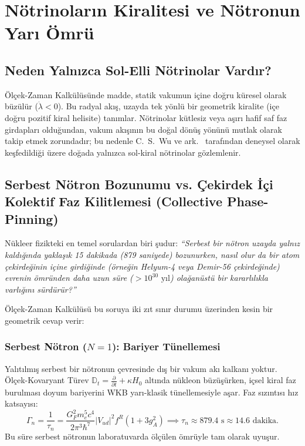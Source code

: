 \documentclass[11pt,a4paper]{article}
\begin{document}
\section{Nötrinoların Kiralitesi ve Nötronun Yarı Ömrü}

\label{sec:notrino_ve_omur}

\subsection{Neden Yalnızca Sol-Elli Nötrinolar Vardır?}
Ölçek-Zaman Kalkülüsünde madde, statik vakumun içine doğru küresel olarak büzülür ($\dot{\lambda} < 0$). Bu radyal akış, uzayda tek yönlü bir geometrik kiralite (içe doğru pozitif kiral helisite) tanımlar. Nötrinolar kütlesiz veya aşırı hafif saf faz girdapları olduğundan, vakum akışının bu doğal dönüş yönünü mutlak olarak takip etmek zorundadır; bu nedenle C.~S.~Wu ve ark.~\cite{wu1957} tarafından deneysel olarak keşfedildiği üzere doğada yalnızca sol-kiral nötrinolar gözlemlenir.

\subsection{Serbest Nötron Bozunumu vs. Çekirdek İçi Kolektif Faz Kilitlemesi (Collective Phase-Pinning)}
\label{sec:notron_omru_ve_kararlilik}

Nükleer fizikteki en temel sorulardan biri şudur: \textit{``Serbest bir nötron uzayda yalnız kaldığında yaklaşık 15 dakikada (879 saniyede) bozunurken, nasıl olur da bir atom çekirdeğinin içine girdiğinde (örneğin Helyum-4 veya Demir-56 çekirdeğinde) evrenin ömründen daha uzun süre ($> 10^{30}\text{ yıl}$) olağanüstü bir kararlılıkla varlığını sürdürür?''}

Ölçek-Zaman Kalkülüsü bu soruya iki zıt sınır durumu üzerinden kesin bir geometrik cevap verir:

\subsubsection{Serbest Nötron ($N=1$): Bariyer Tünellemesi}
Yalıtılmış serbest bir nötronun çevresinde dış bir vakum akı kalkanı yoktur. Ölçek-Kovaryant Türev $\mathbb{D}_t = \frac{\partial}{\partial t} + \kappa H_0$ altında nükleon büzüşürken, içsel kiral faz burulması doyum bariyerini WKB yarı-klasik tünellemesiyle aşar. Faz sızıntısı hız katsayısı:
\begin{equation}
    \Gamma_n = \frac{1}{\tau_n} = \frac{G_F^2 m_e^5 c^4}{2\pi^3 \hbar^7} |V_{ud}|^2 f^R (1 + 3 g_A^2) \implies \tau_n \approx 879.4\text{ s} \approx 14.6\text{ dakika}.
    \label{eq:notron_omur}
\end{equation}
Bu süre serbest nötronun laboratuvarda ölçülen ömrüyle tam olarak uyuşur.
\end{document}
